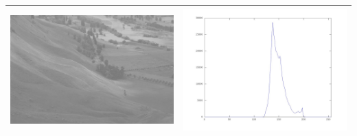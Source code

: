 \documentclass[brazil,times]{abnt}
\begin{document}
\begin{table}[ht]
\begin{tabular}{|c|c|}
			\includegraphics[scale=0.125]{imagens/hawkes.jpg}&\includegraphics[scale=0.15]{imagens/hawkes-hist-original.jpg}\\
			\hline

\end{tabular}
\end{table}
\end{document}
